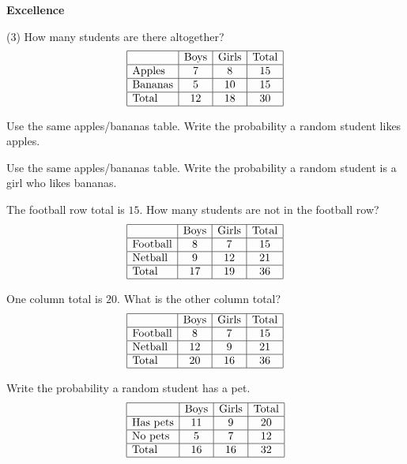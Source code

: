 \documentclass[17pt,a4paper,landscape]{extarticle}
\begin{document}
\sffamily
\boldmath

\boldmath

{\LARGE \textbf{Excellence}}
\begin{tasks}(3)
\task How many students are there altogether?
\[
\begin{array}{|l|c|c|c|}
\hline
 & \text{Boys} & \text{Girls} & \text{Total} \\\hline
\text{Apples} & 7 & 8 & 15 \\\hline
\text{Bananas} & 5 & 10 & 15 \\\hline
\text{Total} & 12 & 18 & 30 \\\hline
\end{array}
\]

\task Use the same apples/bananas table. Write the probability a random student likes apples.

\task Use the same apples/bananas table. Write the probability a random student is a girl who likes bananas.

\task The football row total is \mbox{$15$}. How many students are not in the football row?
\[
\begin{array}{|l|c|c|c|}
\hline
 & \text{Boys} & \text{Girls} & \text{Total} \\\hline
\text{Football} & 8 & 7 & 15 \\\hline
\text{Netball} & 9 & 12 & 21 \\\hline
\text{Total} & 17 & 19 & 36 \\\hline
\end{array}
\]

\task One column total is \mbox{$20$}. What is the other column total?
\[
\begin{array}{|l|c|c|c|}
\hline
 & \text{Boys} & \text{Girls} & \text{Total} \\\hline
\text{Football} & 8 & 7 & 15 \\\hline
\text{Netball} & 12 & 9 & 21 \\\hline
\text{Total} & 20 & 16 & 36 \\\hline
\end{array}
\]

\task Write the probability a random student has a pet.
\[
\begin{array}{|l|c|c|c|}
\hline
 & \text{Boys} & \text{Girls} & \text{Total} \\\hline
\text{Has pets} & 11 & 9 & 20 \\\hline
\text{No pets} & 5 & 7 & 12 \\\hline
\text{Total} & 16 & 16 & 32 \\\hline
\end{array}
\]


\end{tasks}
\end{document}
